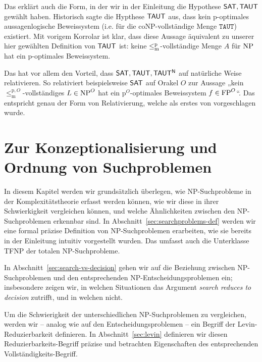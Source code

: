Das erklärt auch die Form, in der wir in der Einleitung die Hypothese $\mathsf{SAT}, \mathsf{TAUT}$ gewählt haben.
Historisch sagte die Hypthese $\mathsf{TAUT}$ aus, dass kein p-optimales aussagenlogische Beweissystem (i.e. für die coNP-vollständige Menge $\mathtt{TAUT}$) existiert.
Mit vorigem Korrolar ist klar, dass diese Aussage äquivalent zu unserer hier gewählten Definition von $\mathsf{TAUT}$ ist: keine $\leq_\mathrm{m}^\mathrm{p}$-vollständige Menge $A$ für $\mathrm{NP}$ hat ein p-optimales Beweissystem.
%

Das hat vor allem den Vorteil, dass $\mathsf{SAT}, \mathsf{TAUT}, \mathsf{TAUT^N}$ auf natürliche Weise relativieren.
So relativiert beispielsweise $\mathsf{SAT}$ auf Orakel $O$ zur Aussage „kein $\leq_\mathrm{m}^{\mathrm p,O}$-vollständiges $L\in\mathrm{NP}^O$ hat ein p${}^O$-optimales Beweissystem $f\in\mathrm{FP}^O$“.
Das entspricht genau der Form von Relativierung, welche als erstes von \textcite{dose_oracle_2020} vorgeschlagen wurde.


\chapter{Zur Konzeptionalisierung und Ordnung von Suchproblemen}\label{chap:searchproblems}

In diesem Kapitel werden wir grundsätzlich überlegen, wie NP-Suchprobleme in der Komplexitätstheorie erfasst werden können, wie wir diese in ihrer Schwierkigkeit vergleichen können, und welche Ähnlichkeiten zwischen den NP-Suchproblemen erkennbar sind. 
In Abschnitt~\ref{sec:searchproblems-def} werden wir eine formal präzise Definition von NP-Suchproblemen erarbeiten, wie sie bereits in der Einleitung intuitiv vorgestellt wurden. Das umfasst auch die Unterklasse TFNP der totalen NP-Suchprobleme.

In Abschnitt~\ref{sec:search-vs-decision} gehen wir auf die Beziehung zwischen NP-Suchproblemen und den entsprechenden NP-Entscheidungsproblemen ein; insbesondere zeigen wir, in welchen Situationen das Argument \emph{search reduces to decision} zutrifft, und in welchen nicht.

Um die Schwierigkeit der unterschiedlichen NP-Suchproblemen zu vergleichen, werden wir -- analog wie auf den Entscheidungsproblemen -- ein Begriff der Levin-Reduzierbarkeit definieren. In Abschnitt~\ref{sec:levin} definieren wir diesen Reduzierbarkeits-Begriff präzise und betrachten Eigenschaften des entsprechenden Vollständigkeits-Begriff.

